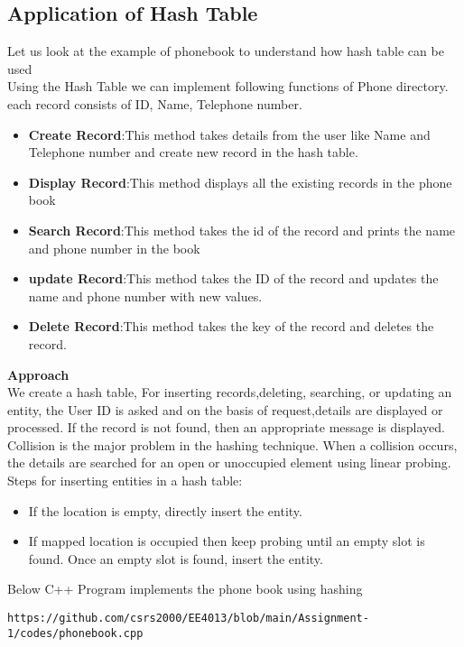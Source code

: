 \documentclass[journal,12pt,twocolumn]{IEEEtran}
\begin{document}
\subsection{\textbf{Application of Hash Table}}
Let us look at the example of phonebook to understand how hash table can be used\\
Using the Hash Table we can implement following functions of Phone directory.
each record consists of ID, Name, Telephone number.
\begin{itemize}
\item \textbf{Create Record}:This method takes details from the user like Name and Telephone number and create new record in the hash table.
\item \textbf{Display Record}:This method displays all the existing records in the phone book
\item \textbf{Search Record}:This method takes the id of the record and prints the name and phone number in the book
\item \textbf{update Record}:This method takes the ID of the record and updates the name and phone number with new values.
\item \textbf{Delete Record}:This method takes the key of the record and deletes the record.
\end{itemize}

\textbf{Approach}
\\
We  create a hash table, For inserting records,deleting, searching, or updating an entity, the User ID is asked and on the basis of request,details are displayed or processed. If the record is not found, then an appropriate message is displayed.\\
Collision is the major problem in the hashing technique.
When a collision occurs, the details are searched for an open or unoccupied element using linear probing.
Steps for inserting entities in a hash table:
\begin{itemize}
\item If the location is empty, directly insert the entity.
\item If mapped location is occupied then keep probing until an empty slot is found. Once an empty slot is found, insert the entity.
\end{itemize}
Below C++ Program implements the  phone book using hashing
\begin{lstlisting}
https://github.com/csrs2000/EE4013/blob/main/Assignment-1/codes/phonebook.cpp
\end{lstlisting}
\end{document}
